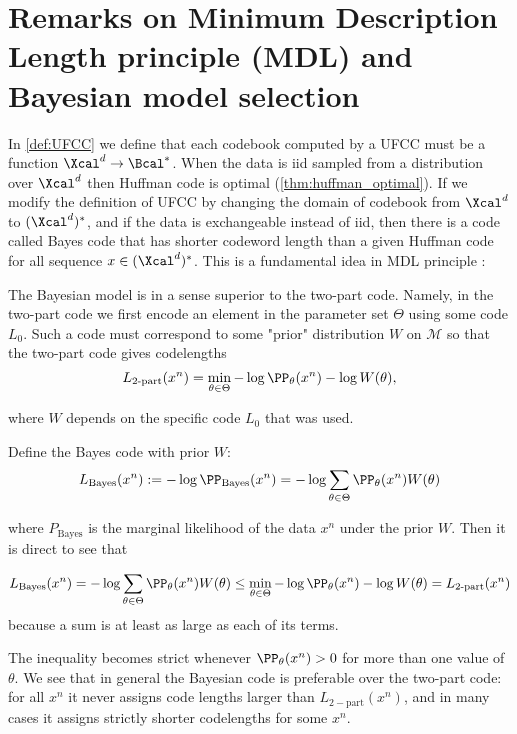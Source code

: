 \section{Remarks on Minimum Description Length principle (MDL) and Bayesian model selection}\label{sec:MDL}

In \cref{def:UFCC} we define that each codebook computed by a UFCC must be a function $\Xcal^d \to \Bcal^*$. When the data is iid sampled from a distribution over $\Xcal^d$ then Huffman code is optimal (\cref{thm:huffman_optimal}). If we modify the definition of UFCC by changing the domain of codebook from $\Xcal^d$ to $(\Xcal^d)^*$, and if the data is exchangeable instead of iid, then there is a code called Bayes code that has shorter codeword length than a given Huffman code for all sequence $x\in (\Xcal^d)^*$. This is a fundamental idea in MDL principle  \citep{grunwald2007minimum}:

\begin{example}\label{eg:Bayes_code_better}

The Bayesian model is in a sense superior to the two-part code. Namely, in the two-part code we first encode an element in the parameter set $\Theta$ using some code $L_0.$ Such a code must correspond to some "prior" distribution $W$ on $\mathcal{M}$ so that the two-part code gives codelengths
\begin{equation}\label{eq:two_part_MDL}
    L_\text{2-part}(x^n)=\min_{\theta\in\Theta}-\log \PP_\theta(x^n)-\log W(\theta),
\end{equation}

where $W$ depends on the specific code $L_0$ that was used. 

Define the Bayes code with prior $W$:
\begin{equation}\label{eq:Bayes_code_MDL}
    L_{\text{Bayes}}(x^n):=-\log \PP_\text{Bayes}(x^n)=-\log\sum_{\theta\in\Theta}\PP_\theta(x^n)W(\theta)
\end{equation}

where $P_\text{Bayes}$ is the marginal likelihood of the data $x^n$ under the prior $W$. Then it is direct to see that

$$L_{\text{Bayes}}(x^n)=-\log\sum_{\theta\in\Theta}\PP_\theta(x^n)W(\theta)\leq\min_{\theta\in\Theta}-\log \PP_\theta(x^n)-\log W(\theta)=L_\text{2-part}(x^n)$$
because a sum is at least as large as each of its terms.

The inequality becomes strict whenever $\PP_\theta(x^n)>0$ for more than one value of $\theta$. We see that in general the Bayesian code is preferable over the two-part code: for all $x^n$ it never assigns code lengths larger than $L_{2-\text{part}}( x^n)$, and in many cases it assigns strictly shorter codelengths for some $x^n$.    
\end{example}

